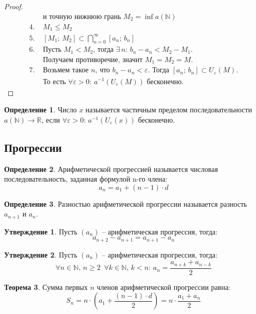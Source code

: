 \documentclass[12pt]{article}
\theoremstyle{definition}
\newtheorem{theorem}{Теорема}[section]
\newtheorem{definition}{Определение}
\newtheorem{statement}[theorem]{Утверждение}
\newcommand{\N}{\mathbb{N}}
\newcommand{\R}{\mathbb{R}}
\begin{document}
\begin{proof}
\begin{align*}
        &\text{и точную нижнюю грань } M_2 = \inf a(\N)\\
        4.\,\,&M_1\leq M_2\\
        5.\,\,&[M_1;\,M_2]\subset \bigcap_{n=0}^{\infty}[a_n;\,b_n]\\
        6.\,\,&\text{Пусть } M_1<M_2\text{, тогда } \exists\, n:\, b_n-a_n<M_2-M_1.\\
        &\text{Получаем противоречие, значит } M_1=M_2=M.\\
        7.\,\,&\text{Возьмем такое } n \text{, что } b_n-a_n<\varepsilon. \text{ Тогда } [a_n;\,b_n]\subset U_{\varepsilon}(M).\\
        &\text{То есть }\forall \varepsilon>0:\, a^{-1}(U_{\varepsilon}(M))\text{ бесконечно.}
    \end{align*}
\end{proof}
\begin{definition}
    Число $x$ называется частичным пределом последовательности $a(\N)\to \R$, если $\forall \varepsilon>0:\, a^{-1}(U_{\varepsilon}(x))$ бесконечно.
\end{definition}

\subsection{Прогрессии}

\begin{definition}
    Арифметической прогрессией называется числовая последовательность, заданная формулой n-го члена:
    $$a_n=a_1+(n-1)\cdot d$$
\end{definition}

\begin{definition}
    Разностью арифметической прогрессии называется разность $a_{n+1}$ и $a_n$.
\end{definition}

\begin{statement}
    Пусть $(a_n)$ -- арифметическая прогрессия, тогда:
    $$a_{n+2}-a_{n+1}=a_{n+1}-a_n$$
\end{statement}

\begin{statement}
    Пусть $(a_n)$ -- арифметическая прогрессия, тогда:
    $$\forall n \in \N,\,n\geq 2 \,\,\,\forall k \in \N,\, k<n:\, a_n=\frac{a_{n+k}+a_{n-k}}{2}$$
\end{statement}

\begin{theorem}
    Сумма первых $n$ членов арифметической прогрессии равна:
    $$S_n=n\cdot \left(a_1+\frac{(n-1)\cdot d}{2} \right)=n \cdot \frac{a_1 + a_n}{2}$$
\end{theorem}
\end{document}
